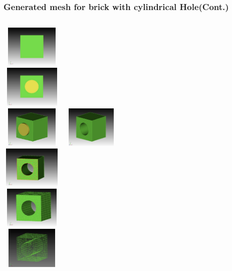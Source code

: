 \documentclass[fleqn]{beamer}
\begin{document}
\begin{frame}
 \frametitle{Generated mesh for brick with cylindrical Hole(Cont.)}

\begin{columns}[t]
\centering
\includegraphics[width=3cm,height=2cm]{figures/step_2.png}\\
\includegraphics[width=3cm,height=2cm]{figures/step_3.png}\\
\includegraphics[width=3cm,height=2cm]{figures/step_4.png}
\centering
\includegraphics[width=3cm,height=2cm]{figures/step_5.png}\\
\includegraphics[width=3cm,height=2cm]{figures/step_7.png}\\
\includegraphics[width=3cm,height=2cm]{figures/step_8.png}\\
\centering
\includegraphics[width=3cm,height=2cm]{figures/step_9.png}\\
\end{columns}

\end{frame}
\end{document}
